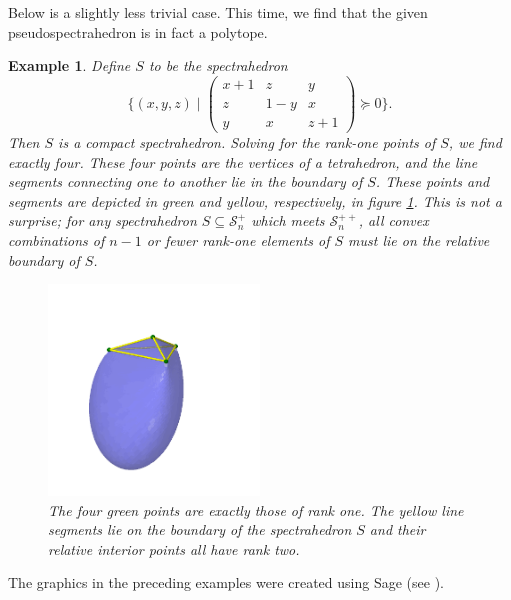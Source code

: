\documentclass[11pt]{article} %
\newtheorem{examp}[thm]{Example}
\newcommand{\s}{\mathcal{S}}
\begin{document}
Below is a slightly less trivial case. This time, we find that the given pseudospectrahedron is in fact a polytope.

\begin{examp}
Define $S$ to be the spectrahedron 
\[\Bigg\{ (x,y,z) \mid \begin{pmatrix}x+1&z&y\\z&1-y&x\\y&x&z+1\end{pmatrix} \succeq 0 \Bigg\}.\]
Then $S$ is a compact spectrahedron. Solving for the rank-one points of $S$, we find exactly four. These four points are the vertices of a tetrahedron, and the line segments connecting one to another lie in the boundary of $S$. These points and segments are depicted in green and yellow, respectively, in figure \ref{3d}. This is not a surprise; for any spectrahedron $S \subseteq \s_n^{+}$ which meets $\s_n^{++}$, all convex combinations of $n-1$ or fewer rank-one elements of $S$ must lie on the relative boundary of $S$.
\begin{figure}[H]

   \begin{center}
    \includegraphics[width=0.5\textwidth]{3dSpect3.png}
    \caption{The four green points are exactly those of rank one. The yellow line segments lie on the boundary of the spectrahedron $S$ and their relative interior points all have rank two.}
    \label{3d}
  \end{center}
\end{figure}
\end{examp}
The graphics in the preceding examples were created using Sage (see \cite{SAGE}).


\end{document}
